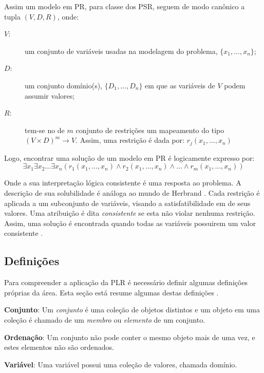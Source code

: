 \documentclass[12pt]{article}
\theoremstyle{definition}
\begin{document}
Assim um modelo em PR, para  classe dos PSR, seguem de modo canônico a tupla  \textit{$(V, D, R)$}, onde:

\begin{description}
\item[$V$:] um conjunto de variáveis usadas na modelagem do problema, $\{ x_{1}, ... , x_{n} \}$;
\item[$D$:] um conjunto domínio(s), $\{ D_{1},...,D_{n} \}$ em que as variáveis de $V$ podem assumir valores;
\item[$R$:] tem-se no de $m$ conjunto de restrições  um mapeamento do tipo $(V \times D)^m \rightarrow V$.
 	     Assim, uma restriç\~ao é dada por: $r_j(x_1, ... , x_n)$ 
\end{description}

Logo, encontrar uma soluç\~ao de um modelo em PR é logicamente expresso por:
$$ \exists x_1 \exists x_2 ... \exists x_n (r_1(x_1, ... , x_n) \wedge r_2(x_1, ... , x_n) \wedge ... \wedge r_m(x_1, ... , x_n) )  $$ 

Onde a sua interpretação lógica consistente é uma resposta ao problema. A descrição
de sua solubilidade é análoga ao mundo de Herbrand \cite{RusNorv}.  Cada restrição é aplicada a um subconjunto de variáveis, visando a satisfatibilidade em de  seus valores. Uma atribuição é dita \textit{consistente} se esta não violar nenhuma restrição. Assim,  uma solução é encontrada quando todas as variáveis possuirem um valor consistente \cite{apt_2003, rina2003, rossi2006}.


\subsection{Definições} %
\label{sec_def}

Para compreender a aplicação da PLR é necessário definir algumas definições próprias da área. Esta seção está resume algumas destas definições  \cite{rina2003, apt_2003}.


\textbf{Conjunto}: Um \textit{conjunto} é uma coleção de objetos distintos e um objeto em uma coleção é chamado de um \textit{membro} ou \textit{elemento} de um conjunto.

\textbf{Ordenação}: Um conjunto não pode conter o mesmo objeto mais de uma vez, e estes elementos não são ordenados.

\textbf{Variável}: Uma variável possui uma coleção de valores, chamada domínio.
\end{document}
